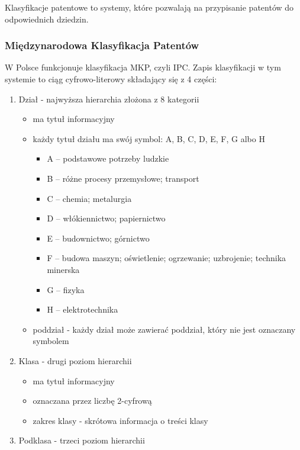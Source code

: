 Klasyfikacje patentowe to systemy, które pozwalają na przypisanie
patentów do odpowiednich dziedzin.

\subsubsection{Międzynarodowa Klasyfikacja Patentów}

W Polsce funkcjonuje klasyfikacja
\ac{MKP}, czyli \ac{IPC}. Zapis klasyfikacji w tym systemie to ciąg
cyfrowo-literowy składający się z 4 części:

\begin{enumerate}
    \item Dział - najwyższa hierarchia złożona z 8 kategorii
    \begin{itemize}
        \item ma tytuł informacyjny
        \item każdy tytuł działu ma swój symbol: A, B, C, D, E, F, G albo H
        \begin{itemize}
            \item A – podstawowe potrzeby ludzkie
            \item B – różne procesy przemysłowe; transport
            \item C – chemia; metalurgia
            \item D – włókiennictwo; papiernictwo
            \item E – budownictwo; górnictwo
            \item F – budowa maszyn; oświetlenie; ogrzewanie; uzbrojenie; technika minerska
            \item G – fizyka
            \item H – elektrotechnika
        \end{itemize}
        \item poddział - każdy dział może zawierać poddział, który nie jest oznaczany symbolem
    \end{itemize}
    \item Klasa - drugi poziom hierarchii
    \begin{itemize}
        \item ma tytuł informacyjny
        \item oznaczana przez liczbę 2-cyfrową
        \item zakres klasy - skrótowa informacja o treści klasy
    \end{itemize}
    \item Podklasa - trzeci poziom hierarchii
    \begin{itemize}

\end{itemize}
\end{enumerate}
